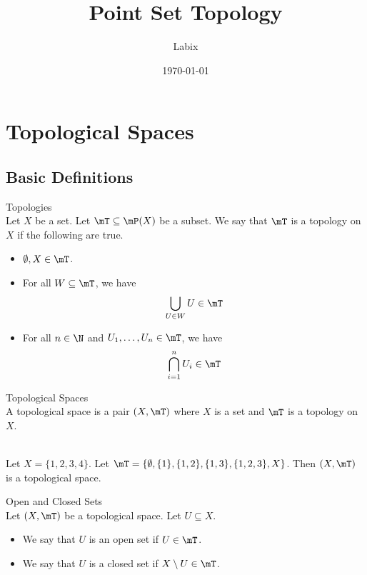 \documentclass[a4paper]{article}
\title{Point Set Topology}
\author{Labix}
\date{\today}
\begin{document}
\maketitle

\pagebreak
\tableofcontents
\pagebreak
\section{Topological Spaces}
\subsection{Basic Definitions}
\begin{defn}{Topologies}{}\\
Let $X$ be a set. Let $\mT\subseteq\mP(X)$ be a subset. We say that $\mT$ is a topology on $X$ if the following are true. 
\begin{itemize}
\item $\emptyset, X\in\mT$. 
\item For all $W\subseteq\mT$, we have $$\bigcup_{U\in W}U\in\mT$$
\item For all $n\in\N$ and $U_1,\dots,U_n\in\mT$, we have $$\bigcap_{i=1}^nU_i\in\mT$$
\end{itemize}
\end{defn}

\begin{defn}{Topological Spaces}{}\\
A topological space is a pair $(X,\mT)$ where $X$ is a set and $\mT$ is a topology on $X$. 
\end{defn}

\begin{eg}{}{}\\
Let $X=\{1,2,3,4\}$. Let $\mT=\{\emptyset,\{1\},\{1,2\},\{1,3\},\{1,2,3\},X\}$. Then $(X,\mT)$ is a topological space. 
\end{eg}

\begin{defn}{Open and Closed Sets}{}\\
Let $(X,\mT)$ be a topological space. Let $U\subseteq X$. 
\begin{itemize}
\item We say that $U$ is an open set if $U\in\mT$. 
\item We say that $U$ is a closed set if $X\setminus U\in\mT$. 
\end{itemize}
\end{defn}
\end{document}
